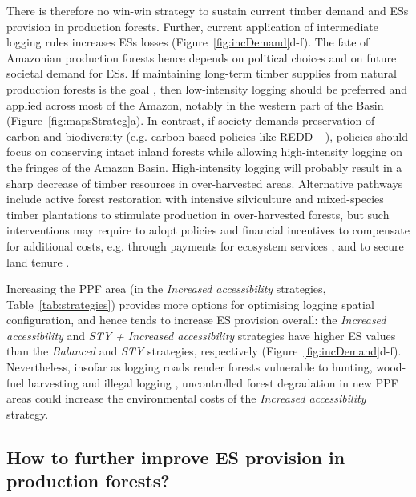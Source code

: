 \documentclass[12pt]{article}
\begin{document}
There is therefore no win-win strategy to sustain current timber demand and ESs provision in production forests. Further, current application of intermediate logging rules increases ESs losses (Figure~\ref{fig:incDemand}d-f). The fate of Amazonian production forests hence depends on political choices and on future societal demand for ESs. If maintaining long-term timber supplies from natural production forests is the goal \cite{Zarin2007}, then low-intensity logging should be preferred and applied across most of the Amazon, notably in the western part of the Basin (Figure~\ref{fig:mapsStrateg}a). In contrast, if society demands preservation of carbon and biodiversity (e.g. carbon-based policies like REDD+ \cite{Stickler2009}), policies should focus on conserving intact inland forests while allowing high-intensity logging on the fringes of the Amazon Basin. High-intensity logging will probably result in a sharp decrease of timber resources in over-harvested areas. Alternative pathways include active forest restoration with intensive silviculture and mixed-species timber plantations \cite{Lamb2005} to stimulate production in over-harvested forests, but such interventions may require to adopt policies and financial incentives to compensate for additional costs, e.g. through payments for ecosystem services \cite{Salzman2018}, and to secure land tenure \cite{Smith2006}.

Increasing the PPF area (in the \textit{Increased accessibility} strategies, Table~\ref{tab:strategies}) provides more options for optimising logging spatial configuration, and hence tends to increase ES provision overall: the \textit{Increased accessibility}  and \textit{STY  + Increased accessibility} strategies have higher ES values than the \textit{Balanced} and \textit{STY} strategies, respectively (Figure~\ref{fig:incDemand}d-f). Nevertheless, insofar as logging roads render forests vulnerable to hunting, wood-fuel harvesting and illegal logging \cite{Laurance2009a}, uncontrolled forest degradation in new PPF areas could increase the environmental costs of the \textit{Increased accessibility} strategy.
 
\subsection*{How to further improve ES provision in production forests?}
\end{document}
